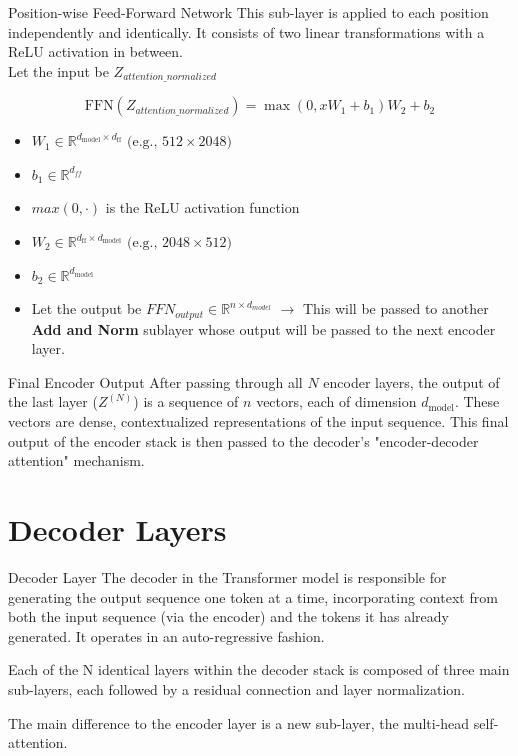 \documentclass{beamer}
\begin{document}
\begin{frame}{Position-wise Feed-Forward Network}
  This sub-layer is applied to each position independently and identically. 
  It consists of two linear transformations with a ReLU activation in between. \\
  Let the input be $Z_{attention\_normalized}$

  $$ \text{FFN}(Z_{attention\_normalized}) = \max(0, xW_1 + b_1)W_2 + b_2 $$

  \begin{itemize}
    \item $ W_1 \in \mathbb{R}^{d_{\text{model}} \times d_{\text{ff}}} \text{ (e.g., } 512 \times 2048) $
    \item $b_1 \in \mathbb{R}^{d_{ff}}$
    \item $max(0, \cdot)$ is the ReLU activation function
    \item $W_2 \in \mathbb{R}^{d_{\text{ff}} \times d_{\text{model}}} \text{ (e.g., } 2048 \times 512)$
    \item $b_2 \in \mathbb{R}^{d_{\text{model}}}$
    \item Let the output be $FFN_{output} \in \mathbb{R}^{n \times d_{model}}$ $\rightarrow$ This will be passed to another \textbf{Add and Norm} sublayer
    whose output will be passed to the next encoder layer. 
  \end{itemize}
\end{frame}


\begin{frame}{Final Encoder Output}
  After passing through all $N$ encoder layers, the output of the last layer ($Z^{(N)}$) is a sequence of $n$ vectors, each of dimension $d_{\text{model}}$. These vectors are dense, contextualized representations of the input sequence. This final output of the 
  encoder stack is then passed to the decoder's "encoder-decoder attention" mechanism. \cite{vaswani2017attention}
\end{frame}

\section{Decoder Layers}

\begin{frame}{Decoder Layer}
  The decoder in the Transformer model is responsible for generating the output sequence one token at a time, incorporating context from both the input sequence (via the encoder)
  and the tokens it has already generated. It operates in an auto-regressive fashion.
  
  Each of the N identical layers within the decoder stack is composed of three 
  main sub-layers, each followed by a residual connection and layer normalization.

  The main difference to the encoder layer is a new sub-layer, the multi-head self-attention.
\end{frame}
\end{document}
